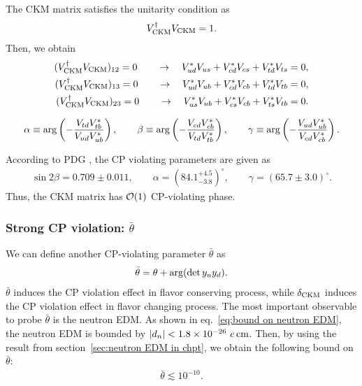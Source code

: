 \documentclass[11pt,a4paper]{article}
\begin{document}
The CKM matrix satisfies the unitarity condition as
\begin{align}
    V^\dagger_{\rm CKM} V_{\rm CKM} = 1.
\end{align}
Then, we obtain
\begin{align}
    (V^\dagger_{\rm CKM} V_{\rm CKM})_{12} = 0 \qquad\to\quad V_{ud}^* V_{us} + V_{cd}^* V_{cs} + V_{td}^* V_{ts} = 0, \\
    (V^\dagger_{\rm CKM} V_{\rm CKM})_{13} = 0 \qquad\to\quad V_{ud}^* V_{ub} + V_{cd}^* V_{cb} + V_{td}^* V_{tb} = 0, \\
    (V^\dagger_{\rm CKM} V_{\rm CKM})_{23} = 0 \qquad\to\quad V_{us}^* V_{ub} + V_{cs}^* V_{cb} + V_{ts}^* V_{tb} = 0.
\end{align}

\begin{align}
    \alpha \equiv {\rm arg}\left( -\frac{V_{td} V_{tb}^*}{V_{ud} V_{ub}^*} \right), \qquad
    \beta \equiv {\rm arg}\left( -\frac{V_{cd} V_{cb}^*}{V_{td} V_{tb}^*} \right), \qquad
    \gamma \equiv {\rm arg}\left( -\frac{V_{ud} V_{ub}^*}{V_{cd} V_{cb}^*} \right).
\end{align}

According to PDG \cite{ParticleDataGroup:2024cfk}, the CP violating parameters are given as
\begin{align}
    \sin 2\beta = 0.709 \pm 0.011, \qquad
    \alpha = (84.1^{+4.5}_{-3.8})^\circ, \qquad
    \gamma = (65.7 \pm 3.0)^\circ.
\end{align}
Thus, the CKM matrix has ${\cal O}(1)$ CP-violating phase.

\subsubsection{Strong CP violation: $\bar\theta$}
We can define another CP-violating parameter $\bar\theta$ as
\begin{align}
    \bar\theta = \theta + {\rm arg}(\det y_u y_d).
\end{align}
$\bar\theta$ induces the CP violation effect in flavor conserving process, while $\delta_{\rm CKM}$ induces the CP violation effect in flavor changing process. The most important observable to probe $\bar\theta$ is the neutron EDM.
As shown in eq.~\eqref{eq:bound on neutron EDM}, the neutron EDM is bounded by $|d_n| < 1.8 \times 10^{-26}~e\,{\rm cm}$.
Then, by using the result from section~\ref{sec:neutron EDM in chpt}, we obtain the following bound on $\bar\theta$:
\begin{align}
    \bar\theta \lesssim 10^{-10}.
\end{align}
\end{document}
